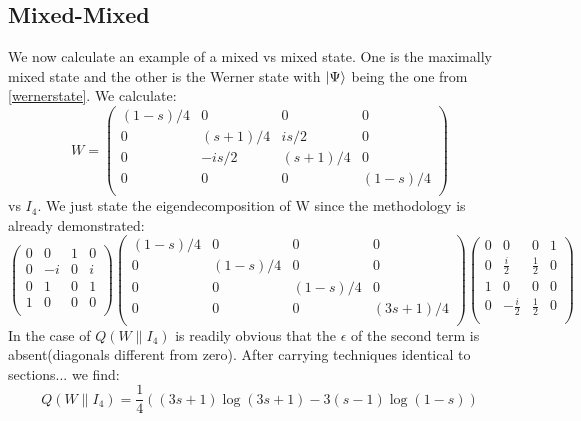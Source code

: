 \subsection{Mixed-Mixed}
We now calculate an example of a mixed vs mixed state. One is the maximally mixed state and the other is the Werner state with $\ket{\Psi}$ being the one from \eqref{wernerstate}. We calculate:
\begin{equation}
W=\left(
\begin{array}{cccc}
 (1-s)/4 & 0 & 0 & 0 \\
 0 & (s+1)/4 & is/2 & 0 \\
 0 & -is/2 & (s+1)/4 & 0 \\
 0 & 0 & 0 & (1-s)/4 \\
\end{array}
\right)
\end{equation}
vs
$I_4$.
We just state the eigendecomposition of W since the methodology is already demonstrated:
\begin{equation*}
\left(
\begin{array}{cccc}
 0 & 0 & 1 & 0 \\
 0 & -i & 0 & i \\
 0 & 1 & 0 & 1 \\
 1 & 0 & 0 & 0 \\
\end{array}
\right)
\left(
\begin{array}{cccc}
 (1-s)/4 & 0 & 0 & 0 \\
 0 & (1-s)/4 & 0 & 0 \\
 0 & 0 & (1-s)/4 & 0 \\
 0 & 0 & 0 & (3 s+1)/4 \\
\end{array}
\right)
\left(
\begin{array}{cccc}
 0 & 0 & 0 & 1 \\
 0 & \frac{i}{2} & \frac{1}{2} & 0 \\
 1 & 0 & 0 & 0 \\
 0 & -\frac{i}{2} & \frac{1}{2} & 0 \\
\end{array}
\right)
\end{equation*}
In the case  of $Q(W \| I_4)$ is readily obvious that the $\epsilon$ of the second term is absent(diagonals different from zero).
After carrying techniques  identical to sections... we find:
\begin{equation}
Q(W\|I_4)= \frac{1}{4} ((3 s+1) \log (3 s+1)-3 (s-1) \log (1-s))
\label{hjreherjrie}
\end{equation}
